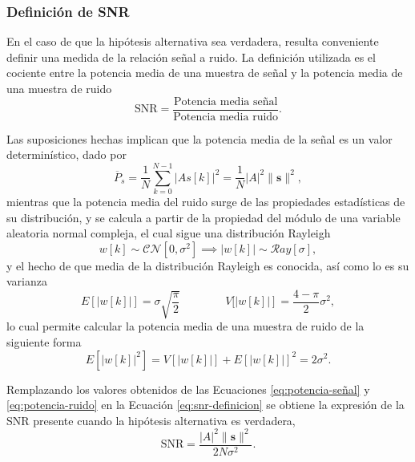 \subsubsection{Definición de SNR}
\label{Ss:def-snr}

En el caso de que la hipótesis alternativa sea verdadera, resulta conveniente definir una medida de la relación señal a ruido. La definición utilizada es el cociente entre la potencia media de una muestra de señal y la potencia media de una muestra de ruido
\begin{equation}\label{eq:snr-definicion}
\text{SNR} = \frac{\text{Potencia media señal}}{\text{Potencia media ruido}}.
\end{equation}

Las suposiciones hechas implican que la potencia media de la señal es un valor determinístico, dado por
\begin{equation}\label{eq:potencia-señal}
\overline{P}_s = \frac{1}{N}\sum_{k=0}^{N-1}\lvert A s[k] \rvert^2 = \frac{1}{N} \lvert A \rvert^2 \lVert \mathbf{s} \rVert^2,
\end{equation}
mientras que la potencia media del ruido surge de las propiedades estadísticas de su distribución, y se calcula a partir de la propiedad del módulo de una variable aleatoria normal compleja, el cual sigue una distribución Rayleigh
\begin{equation}
w[k] \sim \mathcal{CN}\left[0, \sigma^2\right]  \implies|w[k]| \sim \mathcal{R}ay\left[\sigma\right],
\end{equation}
y el hecho de que media de la distribución Rayleigh es conocida, así como lo es su varianza
\begin{equation}
E\left[\lvert w[k]\rvert\right] = \sigma \sqrt{\frac{\pi}{2}}\qquad\qquad V[\left\lvert w[k] \rvert\right] = \frac{4-\pi}{2} \sigma^2,
\end{equation}
lo cual permite calcular la potencia media de una muestra de ruido de la siguiente forma
\begin{equation}\label{eq:potencia-ruido}
    E\left[\lvert w[k]\rvert^2\right] = V\left[\lvert w[k]\rvert\right] + E\left[\lvert w[k]\rvert\right]^2 =  2\sigma^2.
\end{equation}

Remplazando los valores obtenidos de las Ecuaciones \ref{eq:potencia-señal} y \ref{eq:potencia-ruido} en la Ecuación \ref{eq:snr-definicion} se obtiene la expresión de la SNR presente cuando la hipótesis alternativa es verdadera,
\begin{equation}
\text{SNR} = \frac{\lvert A\rvert^2 \lVert \mathbf{s} \rVert ^2}{2N \sigma^2}.
\end{equation}

